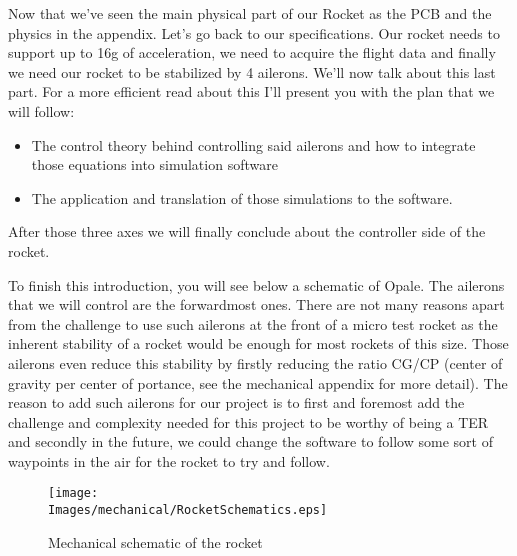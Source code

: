 Now that we've seen the main physical part of our Rocket as the PCB and the
physics in the appendix. Let's go back to our specifications. Our rocket needs
to support up to 16g of acceleration, we need to acquire the flight data and
finally we need our rocket to be stabilized by 4 ailerons. We'll now talk about
this last part. For a more efficient read about this I'll present you with the
plan that we will follow:

\begin{itemize}
    \item The control theory behind controlling said ailerons and how to integrate those
          equations into simulation software
    \item The application and translation of those simulations to the software.
\end{itemize}

After those three axes we will finally conclude about the controller side of
the rocket.

To finish this introduction, you will see below a schematic of Opale. The
ailerons that we will control are the forwardmost ones. There are not many
reasons apart from the challenge to use such ailerons at the front of a micro
test rocket as the inherent stability of a rocket would be enough for most
rockets of this size. Those ailerons even reduce this stability by firstly
reducing the ratio CG/CP (center of gravity per center of portance, see the
mechanical appendix for more detail). The reason to add such ailerons for our
project is to first and foremost add the challenge and complexity needed for
this project to be worthy of being a TER and secondly in the future, we could
change the software to follow some sort of waypoints in the air for the rocket
to try and follow.

\begin{figure}[!hbt]
    \centering
    \texttt{[image: \\Images/mechanical/RocketSchematics.eps]}
    \caption{Mechanical schematic of the rocket}
\end{figure}
\FloatBarrier





